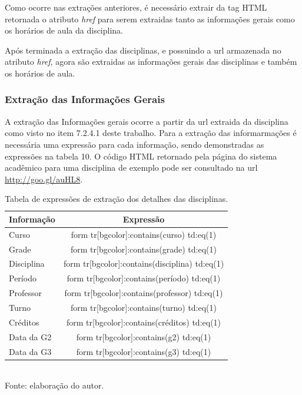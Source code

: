 Como ocorre nas extrações anteriores, é necessário extrair da tag HTML retornada o atributo \emph{href} para serem extraidas tanto as informações gerais como os horários de aula da disciplina.

Após terminada a extração das disciplinas, e possuindo a url armazenada no atributo \emph{href}, agora são extraidas as informações gerais das disciplinas e também os horários de aula.

\subsubsection{Extração das Informações Gerais}
A extração das Informações gerais ocorre a partir da url extraida da disciplina como visto no item 7.2.4.1 deste trabalho. Para a extração das informarmações é necessária uma expressão para cada informação, sendo demonstradas as expressões na tabela 10. O código HTML retornado pela página do sistema acadêmico para uma disciplina de exemplo pode ser consultado na url \url{http://goo.gl/auHL8}.

\begin{table}[!hbt]
\centering
\caption[Extração de Informações - Expressões de Extração dos Detalhes da Disciplina]{Tabela de expressões de extração dos detalhes das disciplinas.}
\vspace{3mm}
\begin{tabular}{p{3cm}|c}\hline
\bf{Informação} & \bf{Expressão}                                 \\ \hline
Curso           & form tr[bgcolor]:contains(curso) td:eq(1)      \\ \hline
Grade           & form tr[bgcolor]:contains(grade) td:eq(1)      \\ \hline
Disciplina      & form tr[bgcolor]:contains(disciplina) td:eq(1) \\ \hline
Período         & form tr[bgcolor]:contains(período) td:eq(1)    \\ \hline
Professor       & form tr[bgcolor]:contains(professor) td:eq(1)  \\ \hline
Turno           & form tr[bgcolor]:contains(turno) td:eq(1)      \\ \hline
Créditos        & form tr[bgcolor]:contains(créditos) td:eq(1)   \\ \hline
Data da G2      & form tr[bgcolor]:contains(g2) td:eq(1)         \\ \hline
Data da G3      & form tr[bgcolor]:contains(g3) td:eq(1)         \\ \hline
\end{tabular}
\\ Fonte: elaboração do autor.
\end{table}


